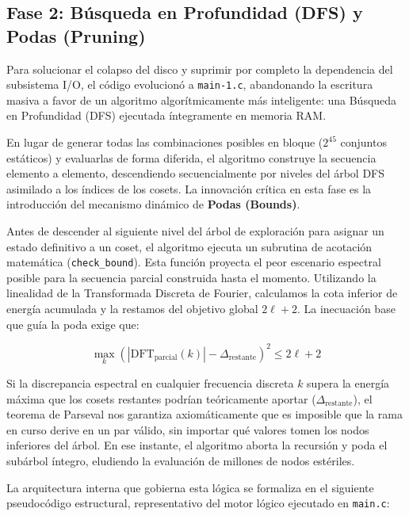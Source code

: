 \documentclass[12pt,a4paper]{tfg_domingo}
\begin{document}
\subsection{Fase 2: Búsqueda en Profundidad (DFS) y Podas (Pruning)}
Para solucionar el colapso del disco y suprimir por completo la
dependencia del subsistema I/O, el código evolucionó a
\texttt{main-1.c}, abandonando la escritura masiva a favor de un
algoritmo algorítmicamente más inteligente: una Búsqueda en
Profundidad (DFS) ejecutada íntegramente en memoria RAM. 

En lugar de generar todas las combinaciones posibles en bloque
($2^{45}$ conjuntos estáticos) y evaluarlas de forma diferida, el
algoritmo construye la secuencia elemento a elemento, descendiendo
secuencialmente por niveles del árbol DFS asimilado a los índices de
los cosets. La innovación crítica en esta fase es la introducción del
mecanismo dinámico de \textbf{Podas (Bounds)}. 

Antes de descender al siguiente nivel del árbol de exploración para
asignar un estado definitivo a un coset, el algoritmo ejecuta un
subrutina de acotación matemática (\texttt{check\_bound}). Esta
función proyecta el peor escenario espectral posible para la secuencia
parcial construida hasta el momento. Utilizando la linealidad de la
Transformada Discreta de Fourier, calculamos la cota inferior de
energía acumulada y la restamos del objetivo global $2\ell + 2$. La
inecuación base que guía la poda exige que: 

$$ \max_{k} \left( | \text{DFT}_{\text{parcial}}(k) | - \Delta_{\text{restante}} \right)^2 \le 2\ell + 2 $$

Si la discrepancia espectral en cualquier frecuencia discreta $k$
supera la energía máxima que los cosets restantes podrían teóricamente
aportar ($\Delta_{\text{restante}}$), el teorema de Parseval nos garantiza
axiomáticamente que es imposible que la rama en curso derive en un par
válido, sin importar qué valores tomen los nodos inferiores del
árbol. En ese instante, el algoritmo aborta la recursión y poda el
subárbol íntegro, eludiendo la evaluación de millones de nodos
estériles. 

La arquitectura interna que gobierna esta lógica se formaliza en el
siguiente pseudocódigo estructural, representativo del motor lógico
ejecutado en \texttt{main.c}: 
\end{document}
